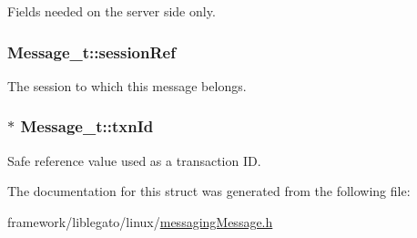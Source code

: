 Fields needed on the server side only. 

\subsubsection[{\texorpdfstring{session\+Ref}{sessionRef}}]{ Message\+\_\+t\+::session\+Ref}\hypertarget{struct_message__t_a01f203ceb4faa9bfc6064ca7e1817762}{}\label{struct_message__t_a01f203ceb4faa9bfc6064ca7e1817762}


The session to which this message belongs. 

\subsubsection[{\texorpdfstring{txn\+Id}{txnId}}]{$\ast$ Message\+\_\+t\+::txn\+Id}\hypertarget{struct_message__t_a60ed9a745c56fe5267a30341e1f637e6}{}\label{struct_message__t_a60ed9a745c56fe5267a30341e1f637e6}


Safe reference value used as a transaction ID. 



The documentation for this struct was generated from the following file\+:\begin{DoxyCompactItemize}
\item 
framework/liblegato/linux/\hyperlink{messaging_message_8h}{messaging\+Message.\+h}\end{DoxyCompactItemize}
